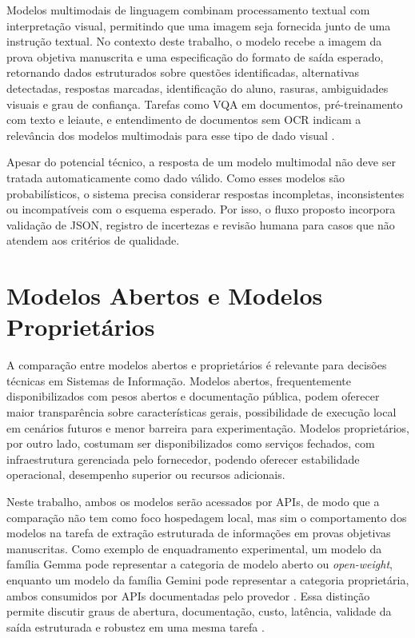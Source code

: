 Modelos multimodais de linguagem combinam processamento textual com interpretação visual, permitindo que uma imagem seja fornecida junto de uma instrução textual. No contexto deste trabalho, o modelo recebe a imagem da prova objetiva manuscrita e uma especificação do formato de saída esperado, retornando dados estruturados sobre questões identificadas, alternativas detectadas, respostas marcadas, identificação do aluno, rasuras, ambiguidades visuais e grau de confiança. Tarefas como VQA em documentos, pré-treinamento com texto e leiaute, e entendimento de documentos sem OCR indicam a relevância dos modelos multimodais para esse tipo de dado visual \cite{mathew2021docvqa,xu2020layoutlm,kim2022donut}.

Apesar do potencial técnico, a resposta de um modelo multimodal não deve ser tratada automaticamente como dado válido. Como esses modelos são probabilísticos, o sistema precisa considerar respostas incompletas, inconsistentes ou incompatíveis com o esquema esperado. Por isso, o fluxo proposto incorpora validação de JSON, registro de incertezas e revisão humana para casos que não atendem aos critérios de qualidade.

\section{Modelos Abertos e Modelos Proprietários}

A comparação entre modelos abertos e proprietários é relevante para decisões técnicas em Sistemas de Informação. Modelos abertos, frequentemente disponibilizados com pesos abertos e documentação pública, podem oferecer maior transparência sobre características gerais, possibilidade de execução local em cenários futuros e menor barreira para experimentação. Modelos proprietários, por outro lado, costumam ser disponibilizados como serviços fechados, com infraestrutura gerenciada pelo fornecedor, podendo oferecer estabilidade operacional, desempenho superior ou recursos adicionais.

Neste trabalho, ambos os modelos serão acessados por APIs, de modo que a comparação não tem como foco hospedagem local, mas sim o comportamento dos modelos na tarefa de extração estruturada de informações em provas objetivas manuscritas. Como exemplo de enquadramento experimental, um modelo da família Gemma pode representar a categoria de modelo aberto ou \textit{open-weight}, enquanto um modelo da família Gemini pode representar a categoria proprietária, ambos consumidos por APIs documentadas pelo provedor \cite{google2026gemma,google2026gemmageminiapi,google2026geminiapi}. Essa distinção permite discutir graus de abertura, documentação, custo, latência, validade da saída estruturada e robustez em uma mesma tarefa \cite{solaiman2023gradient,bommasani2023transparency,ntia2024openweights,nist2023airmf}.

